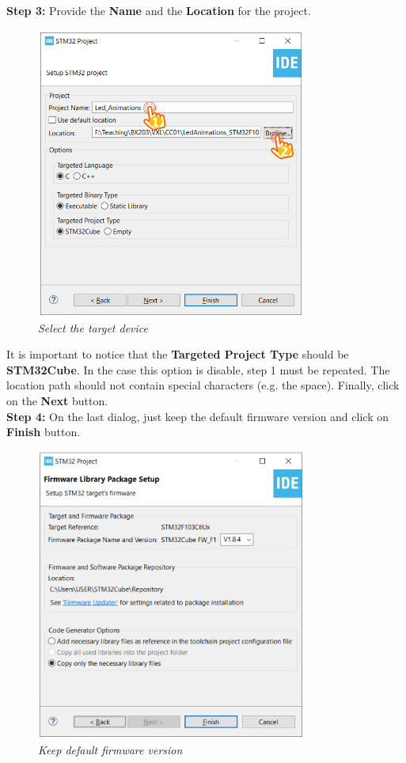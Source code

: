 \textbf{Step 3: } Provide the \textbf{Name} and the \textbf{Location} for the project.

\newpage
\begin{figure}[!htp]
    \centering
    \includegraphics[width=3.5in]{source/picture/bai_1/stm_03.PNG}
    \caption{\textit{Select the target device}}
    \label{bai1_stm3}
\end{figure}

It is important to notice that the \textbf{Targeted Project Type} should be \textbf{STM32Cube}. In the case this option is disable, step 1 must be repeated. The location path should not contain special characters (e.g. the space). Finally, click on the \textbf{Next} button.\\

\textbf{Step 4: } On the last dialog, just keep the default firmware version and click on \textbf{Finish} button.

\begin{figure}[!htp]
    \centering
    \includegraphics[width=3.5in]{source/picture/bai_1/stm_04.PNG}
    \caption{\textit{Keep default firmware version}}
    \label{bai1_stm4}
\end{figure}

